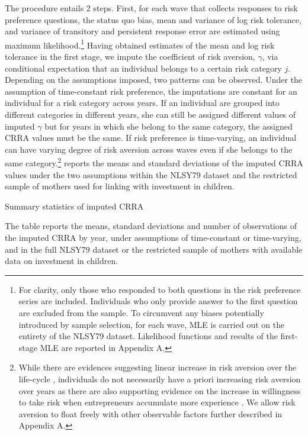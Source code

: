 \documentclass[]{article}
\begin{document}
The procedure entails 2 steps. First, for each wave that collects responses to risk preference questions, the status quo bias, mean and variance of log risk tolerance, and variance of transitory and persistent response error are estimated using maximum likelihood.\footnote{For clarity, only those who responded to both questions in the risk preference series are included. Individuals who only provide answer to the first question are excluded from the sample. To circumvent any biases potentially introduced by sample selection, for each wave, MLE is carried out on the entirety of the NLSY79 dataset. Likelihood functions and results of the first-stage MLE are reported in \alert{Appendix A}.} Having obtained estimates of the mean and log risk tolerance in the first stage, we impute the coefficient of risk aversion, $\gamma$, via conditional expectation that an individual belongs to a certain risk category $j$. Depending on the assumptions imposed, two patterns can be observed. Under the assumption of time-constant risk preference, the imputations are constant for an individual for a risk category across years. \alert{If an individual are grouped into different categories in different years, she can still be assigned different values of imputed $\gamma$ but for years in which she belong to the same category, the assigned CRRA values must be the same.} If risk preference is time-varying, an individual can have varying degree of risk aversion across waves even if she belongs to the same category.\footnote{While there are evidences suggesting linear increase in risk aversion over the life-cycle \citep{dohmen2017risk}, individuals do not necessarily have a priori increasing risk aversion over years as there are also supporting evidence on the increase in willingness to take risk when entrepreneurs accumulate more experience  \citep{brachert2017simultaneity,cho2021endogenous}. We allow risk aversion to float freely with other observable factors further described in \alert{Appendix A}.}  reports the means and standard deviations of the imputed CRRA values under the two assumptions within the NLSY79 dataset and the restricted sample of mothers used for linking with investment in children.

\begin{table} 
	\centering
	\setlength{\extrarowheight}{0.3em}
	\begin{threeparttable}
		\caption{Summary statistics of imputed CRRA}	
		
		\label{table:CRRA-summary}
	\begin{tablenotes}[flushleft]\footnotesize
		\item The table reports the means, standard deviations and number of observations of the imputed CRRA by year, under assumptions of time-constant or time-varying, and in the full NLSY79 dataset or the restricted sample of mothers with available data on investment in children.
	\end{tablenotes}
	\end{threeparttable}
\end{table}    
\end{document}
